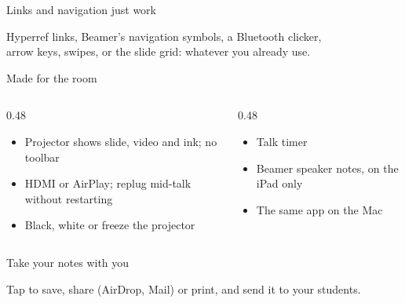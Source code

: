 \documentclass[aspectratio=169,11pt]{beamer}
\newcommand{\feature}[2]{\item[\textcolor{pcViolet}{#1}] #2}
\begin{document}
\begin{frame}[label=links]{Links and navigation just work}
  \centering
  \vspace{1em}

  \vspace{1.5em}
  Hyperref links, Beamer's navigation symbols, a Bluetooth clicker,\\
  arrow keys, swipes, or the slide grid: \alert{whatever you already use}.
\end{frame}

\begin{frame}{Made for the room}
  \begin{columns}[t]
    \begin{column}{0.48\textwidth}
      \begin{itemize}
        \feature{\faTv}{Projector shows slide, video and ink; no toolbar}
        \feature{\faWifi}{HDMI or AirPlay; replug mid-talk without restarting}
        \feature{\faMoon[regular]}{Black, white or freeze the projector}
      \end{itemize}
    \end{column}
    \begin{column}{0.48\textwidth}
      \begin{itemize}
        \feature{\faStopwatch}{Talk timer}
        \feature{\faStickyNote[regular]}{Beamer speaker notes, on the iPad only}
        \feature{\faLaptop}{The same app on the Mac}
      \end{itemize}
    \end{column}
  \end{columns}
\end{frame}

\begin{frame}{Take your notes with you}
  \centering

  \vspace{0.8em}
  Tap \textbf{\faShareSquare[regular]} to save, share (AirDrop, Mail) or print, and send it to your students.
\end{frame}
\end{document}

